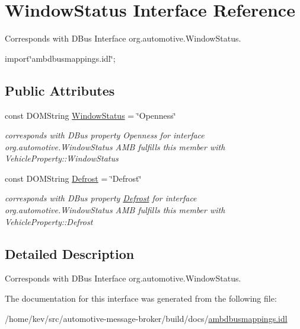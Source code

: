 \hypertarget{interfaceWindowStatus}{\section{Window\+Status Interface Reference}
\label{interfaceWindowStatus}
}


Corresponds with D\+Bus Interface org.\+automotive.\+Window\+Status.  




{\ttfamily import\char`\"{}ambdbusmappings.\+idl\char`\"{};}

\subsection*{Public Attributes}
\begin{DoxyCompactItemize}
\item 
\hypertarget{interfaceWindowStatus_a74f606f1b64d41de4c6f384a2b11e5cb}{const D\+O\+M\+String \hyperlink{interfaceWindowStatus_a74f606f1b64d41de4c6f384a2b11e5cb}{Window\+Status} = \char`\"{}Openness\char`\"{}}\label{interfaceWindowStatus_a74f606f1b64d41de4c6f384a2b11e5cb}

\begin{DoxyCompactList}\small\item\em corresponds with D\+Bus property Openness for interface org.\+automotive.\+Window\+Status A\+M\+B fulfills this member with Vehicle\+Property\+::\+Window\+Status \end{DoxyCompactList}\item 
\hypertarget{interfaceWindowStatus_a0bbf80007f7d60fa748fa730cb53fc12}{const D\+O\+M\+String \hyperlink{interfaceWindowStatus_a0bbf80007f7d60fa748fa730cb53fc12}{Defrost} = \char`\"{}Defrost\char`\"{}}\label{interfaceWindowStatus_a0bbf80007f7d60fa748fa730cb53fc12}

\begin{DoxyCompactList}\small\item\em corresponds with D\+Bus property \hyperlink{interfaceDefrost}{Defrost} for interface org.\+automotive.\+Window\+Status A\+M\+B fulfills this member with Vehicle\+Property\+::\+Defrost \end{DoxyCompactList}\end{DoxyCompactItemize}


\subsection{Detailed Description}
Corresponds with D\+Bus Interface org.\+automotive.\+Window\+Status. 

The documentation for this interface was generated from the following file\+:\begin{DoxyCompactItemize}
\item 
/home/kev/src/automotive-\/message-\/broker/build/docs/\hyperlink{ambdbusmappings_8idl}{ambdbusmappings.\+idl}\end{DoxyCompactItemize}
